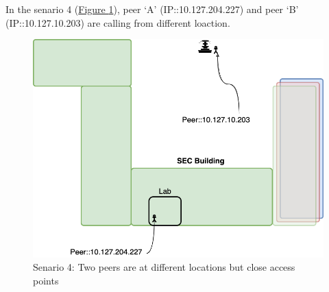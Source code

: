 	In the senario 4 (\hyperref[fig:scene-4]{Figure \ref{fig:scene-4}}), peer `A' (IP::10.127.204.227) and peer `B' (IP::10.127.10.203) are calling from different loaction.
	\begin{figure}[thb]
		\begin{minipage}{\textwidth}
			\includegraphics[scale=0.29]{Images/experiment/senarios/near_fountain.drawio.png}
		\end{minipage}
		\caption{Senario 4: Two peers are at different locations but close access points}
		\label{fig:scene-4}
	\end{figure}

